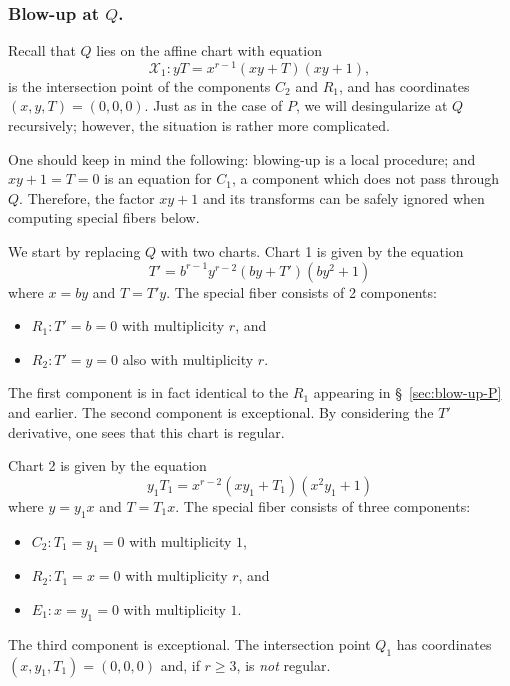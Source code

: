 \documentclass[reqno]{amsart}
\theoremstyle{definition}
\theoremstyle{remark}
\def\XX{\mathcal{X}}
\begin{document}
\subsubsection{Blow-up at $Q$.}
\label{sec:blow-up-Q}

Recall that $Q$ lies on the affine chart with equation
\begin{equation}
  \XX_1:yT = x^{r-1}(xy + T)(xy + 1)\label{eq:C'''},
\end{equation}
is the intersection point of the components $C_2$ and $R_1$, and has coordinates $(x,y,T) = (0,0,0)$. Just as in the case of $P$, we will desingularize at $Q$ recursively; however, the situation is rather more complicated.  

One should keep in mind the following: blowing-up is a local procedure; and $xy + 1 = T = 0$ is an equation for $C_1$, a component which does not pass through $Q$. Therefore, the factor $xy + 1$ and its transforms can be safely ignored when computing special fibers below.

We start by replacing $Q$ with two charts. Chart 1 is given by the equation
\[
T' = b^{r-1}y^{r-2}(by + T')(by^2 + 1)
\]
where $x = by$ and $T = T'y$. The special fiber consists of 2 components:
\begin{itemize}
    \item $R_1: T' = b = 0$ with multiplicity $r$, and
    \item $R_2: T' = y = 0$ also with multiplicity $r$.
\end{itemize}
The first component is in fact identical to the $R_1$ appearing in \S~\ref{sec:blow-up-P} and earlier. The second component is exceptional. By considering the $T'$ derivative, one sees that this chart is regular.

Chart 2 is given by the equation
\[
y_1 T_1 = x^{r-2}(x y_1 + T_1)(x^2 y_1 + 1)
\]
where $y = y_1 x$ and $T = T_1 x$. The special fiber consists of three components:
\begin{itemize}
    \item $C_2: T_1 = y_1 = 0$ with multiplicity $1$,
    \item $R_2: T_1 = x = 0$ with multiplicity $r$, and
    \item $E_1: x = y_1 = 0$ with multiplicity $1$.
\end{itemize}
The third component is exceptional. The intersection point $Q_1$ has coordinates $(x, y_1, T_1) = (0,0,0)$ and, if $r \geq 3$, is \emph{not} regular.
\end{document}
